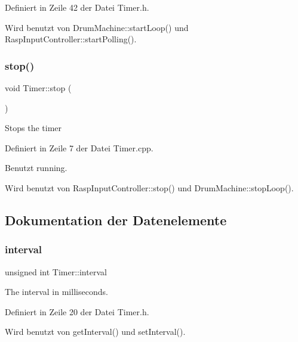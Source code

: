 Definiert in Zeile 42 der Datei Timer.\+h.



Wird benutzt von Drum\+Machine\+::start\+Loop() und Rasp\+Input\+Controller\+::start\+Polling().

\mbox{\label{class_timer_a63f0eb44b27402196590a03781515dba}} 
\subsubsection{\texorpdfstring{stop()}{stop()}}
{\footnotesize\ttfamily void Timer\+::stop (\begin{DoxyParamCaption}{ }\end{DoxyParamCaption})}

Stops the timer 

Definiert in Zeile 7 der Datei Timer.\+cpp.



Benutzt running.



Wird benutzt von Rasp\+Input\+Controller\+::stop() und Drum\+Machine\+::stop\+Loop().



\subsection{Dokumentation der Datenelemente}
\mbox{\label{class_timer_aaf9bce1286b714658a0f4484d8fee960}} 
\subsubsection{\texorpdfstring{interval}{interval}}
{\footnotesize\ttfamily unsigned int Timer\+::interval\hspace{0.3cm}{\ttfamily [private]}}



The interval in milliseconds. 



Definiert in Zeile 20 der Datei Timer.\+h.



Wird benutzt von get\+Interval() und set\+Interval().

\mbox{\label{class_timer_a3d1026dd88596a97cb6b768f475ed57f}} 

